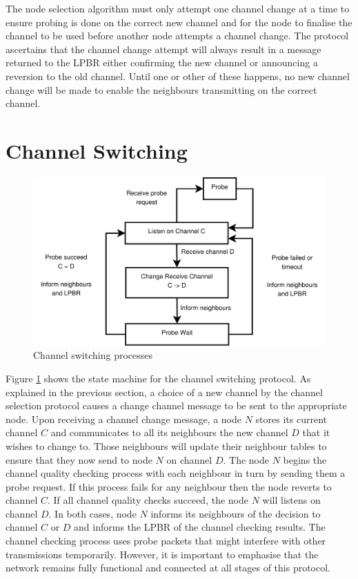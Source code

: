 The node selection algorithm must only attempt one channel change at a time to ensure probing is done on the correct new channel and for the node to finalise the channel to be used before another node attempts a channel change.
The protocol ascertains that the channel change attempt will always result in a message returned to the LPBR either confirming the new channel or announcing a reversion to the old channel. Until one or other of these happens, no new channel change will be made to enable the neighbours transmitting on the correct channel.

\section{Channel Switching}
\begin{figure}
\centering
\includegraphics[width=5.5in]{Diagram1.pdf}
\caption{Channel switching processes}
\label{fig_sim}
\end{figure}

Figure \ref{fig_sim} shows the state machine for the channel switching protocol.
As explained in the previous section, a choice of a new channel by the channel selection protocol causes a change channel message to be sent to the appropriate node. 
Upon receiving a channel change message, a node $N$ stores its current channel $C$ and communicates to all its neighbours the new channel $D$ that it wishes to change to. Those neighbours will update their neighbour tables to ensure that they now send to node $N$ on channel $D$.  The node $N$ begins the channel quality checking process with each neighbour in turn by sending them a probe request. If this process fails for any neighbour then the node reverts to channel $C$. If all channel quality checks succeed, the node $N$ will listens on channel $D$. In both cases, node $N$ informs its neighbours of the decision to channel $C$ or $D$ and informs the LPBR of the channel checking results. The channel checking process uses probe packets that might interfere with other transmissions temporarily. However, it is important to emphasise that the network remains fully functional and connected at all stages of this protocol.

